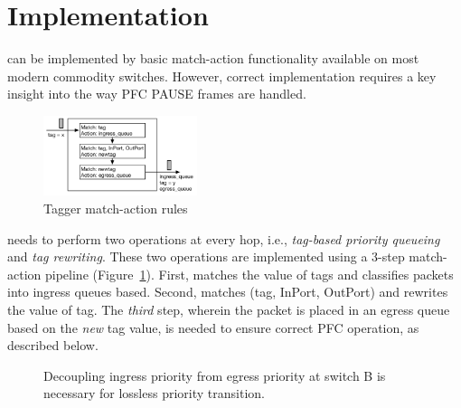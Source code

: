 \section{Implementation}\label{sec:implementation}

\sysname{} can be implemented by basic match-action functionality
available on most modern commodity switches. However, correct implementation
requires a key insight into the way PFC PAUSE frames are handled.

\begin{figure}
	\hspace{-0.2in}
	\centering
	\includegraphics[width=0.4\textwidth] {figs/Tagger}
	\vspace{-1em}
	\caption{Tagger match-action rules}\label{fig:tagger}
	\vspace{-2em}
\end{figure}

 \sysname{} needs to perform two operations at every
hop, i.e., {\em tag-based priority queueing} and {\em tag
rewriting}.  These two operations are implemented using a 3-step match-action
pipeline (Figure~\ref{fig:tagger}).  First, \sysname{} matches
the value of tags and classifies packets into ingress queues based. Second, 
\sysname{} matches (tag, InPort, OutPort) and rewrites the value of tag. 
The {\em third} step, wherein the packet is placed in an egress queue based on the
{\em new} tag value, is needed to ensure correct PFC operation, as described below.

\begin{figure}[t]
  \vspace{-3em}
 	\centering
  \vspace{-1.2em}
  
	 \vspace{-1em}
 	\caption{Decoupling ingress priority from egress priority at switch B is necessary for lossless priority transition.}\label{fig:prioritydecoupling}
	\vspace{-1em}
\end{figure}

